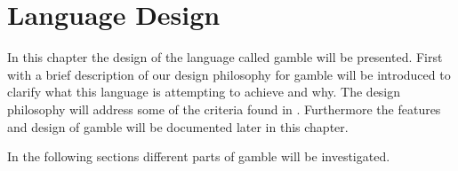 \chapter{Language Design}
\label{cha:language_design}
In this chapter the design of the language called \gls{gamble} will be presented.
First with a brief description of our design philosophy for \gls{gamble} will be introduced to clarify what this language is attempting to achieve and why.
The design philosophy will address some of the criteria found in .
Furthermore the features and design of \gls{gamble} will be documented later in this chapter.



In the following sections different parts of \gls{gamble} will be investigated.











